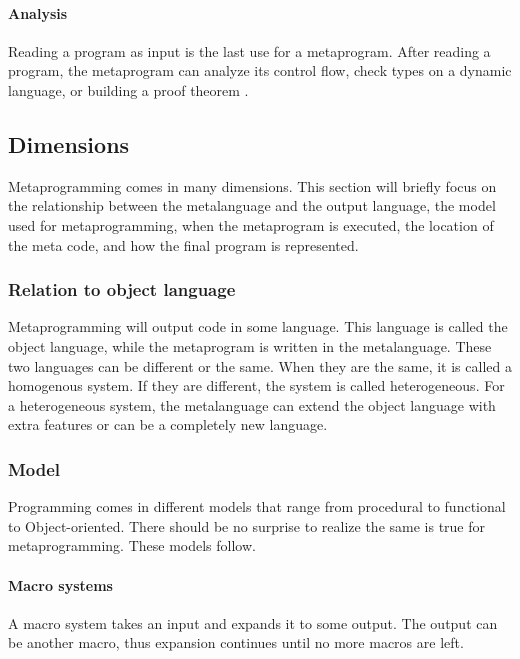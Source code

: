 \paragraph{Analysis}
Reading a program as input is the last use for a metaprogram.
After reading a program, the metaprogram can analyze its control flow, check types on a dynamic language, or building a proof theorem \cite{sheard_01_01}.

\subsection{Dimensions}
Metaprogramming comes in many dimensions.
This section will briefly focus on the relationship between the metalanguage and the output language, the model used for metaprogramming, when the metaprogram is executed, the location of the meta code, and how the final program is represented.

\subsubsection{Relation to object language}
Metaprogramming will output code in some language.
This language is called the object language, while the metaprogram is written in the metalanguage.
These two languages can be different or the same.
When they are the same, it is called a homogenous system.
If they are different, the system is called heterogeneous.
For a heterogeneous system, the metalanguage can extend the object language with extra features or can be a completely new language. \cite{savidis_19_01, sheard_01_01}


\subsubsection{Model}
Programming comes in different models that range from procedural to functional to Object-oriented.
There should be no surprise to realize the same is true for metaprogramming.
These models follow.

\paragraph{Macro systems}
A macro system takes an input and expands it to some output. \cite{savidis_19_01}
The output can be another macro, thus expansion continues until no more macros are left.

